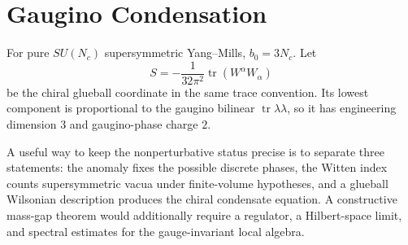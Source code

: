 \section{Gaugino Condensation}
\label{sec:pure-sym-gaugino-condensation}

For pure \(SU(N_c)\) supersymmetric Yang--Mills, \(b_0=3N_c\).  Let
\[
  S=-\frac{1}{32\pi^2}\operatorname{tr}(W^\alpha W_\alpha)
\]
be the chiral glueball coordinate in the same trace convention.  Its lowest
component is proportional to the gaugino bilinear \(\operatorname{tr}\lambda
\lambda\), so it has engineering dimension \(3\) and gaugino-phase charge
\(2\).

A useful way to keep the nonperturbative status precise is to separate three
statements: the anomaly fixes the possible discrete phases, the Witten index
counts supersymmetric vacua under finite-volume hypotheses, and a glueball
Wilsonian description produces the chiral condensate equation.  A constructive
mass-gap theorem would additionally require a regulator, a Hilbert-space
limit, and spectral estimates for the gauge-invariant local algebra.

